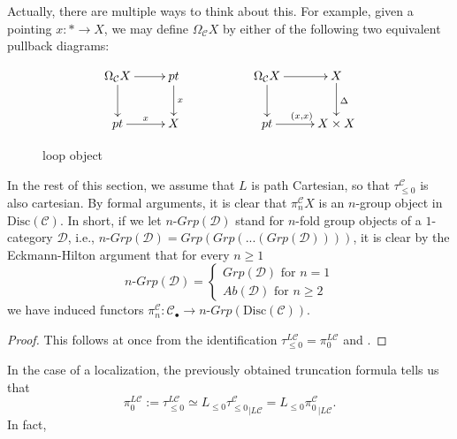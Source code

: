 Actually, there are multiple ways to think about this. For example, given a pointing $x:*\to X$, we may define $\Omega_{\mathcal{C}}X $ by either of the following two equivalent pullback diagrams:
\begin{figure}
\[
\xymatrix{
\Omega_{\mathcal{C}}X \ar[r] \ar[d] & pt\ar[d]^{x} & & \Omega_{\mathcal{C}}X \ar[r] \ar[d] & X \ar[d]^{\Delta }\\pt
\ar[r]^{x} & X & & pt \ar[r]^{(x,x)} & X \times X
}
\]\caption{loop object}\label{loop object}
\end{figure}
In the rest of this section, we assume that $L$ is path Cartesian, so that $\tau_{\leq 0}^\mathcal{C}$ is also cartesian. By formal arguments, it is clear that $\pi_n^\mathcal{C}X$ is an $n$-group object in $\text{Disc}(\mathcal{C})$. In short, if we let $n\mbox{-}Grp(\mathcal{D})$ stand for $n$-fold group objects of a $1$-category $\mathcal{D}$, i.e., $n\mbox{-}Grp(\mathcal{D})=Grp(Grp(...(Grp(\mathcal{D}))))$, it is clear by the Eckmann-Hilton argument that for every $n\geq 1$ \[n\mbox{-}Grp(\mathcal{D})=
\begin{cases}
 Grp(\mathcal{D}) \text{ for }n=1  \\
  Ab(\mathcal{D}) \text{ for }n\geq 2
 
\end{cases}\]
we have induced functors $\pi_n^\mathcal{C}: \mathcal{C_\bullet}\to n\mbox{-}Grp(\text{Disc}(\mathcal{C}))$.
    
    \begin{proof}
        This follows at once from the identification $\tau_{\leq 0}^{L\mathcal{C}}=\pi_0^{L\mathcal{C}}$ and .         \end{proof}
    In the case of a localization, the previously obtained truncation formula tells us that $$\pi_0^{L\mathcal{C}}:=\tau^{L\mathcal{C}}_{\leq 0} \simeq {L_{\leq 0}\tau^\mathcal{C}_{\leq 0}}_{|L\mathcal{C}}={L_{\leq 0}\pi_{ 0}^\mathcal{C}}_{|L\mathcal{C}}.$$ In fact, 

